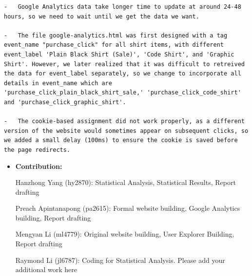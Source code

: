 \documentclass[
  letterpaper,
  DIV=11,
  numbers=noendperiod]{scrartcl}
\begin{document}
\begin{verbatim}
-   Google Analytics data take longer time to update at around 24-48 hours, so we need to wait until we get the data we want.

-   The file google-analytics.html was first designed with a tag event_name "purchase_click" for all shirt items, with different event_label 'Plain Black Shirt (Sale)', 'Code Shirt', and 'Graphic Shirt'. However, we later realized that it was difficult to retreived the data for event_label separately, so we change to incorporate all details in event_name which are 'purchase_click_plain_black_shirt_sale,' 'purchase_click_code_shirt' and 'purchase_click_graphic_shirt'.

-   The cookie-based assignment did not work properly, as a different version of the website would sometimes appear on subsequent clicks, so we added a small delay (100ms) to ensure the cookie is saved before the page redirects.
\end{verbatim}

\begin{itemize}
\item
  \textbf{Contribution:}

  Hanzhong Yang (hy2870): Statistical Analysis, Statistical Results,
  Report drafting

  Preach Apintanapong (pa2615): Formal website building, Google
  Analytics building, Report drafting

  Mengyan Li (ml4779): Original website building, User Explorer
  Building, Report drafting

  Raymond Li (jl6787): Coding for Statistical Analysis. Please add your
  additional work here
\end{itemize}
\end{document}
